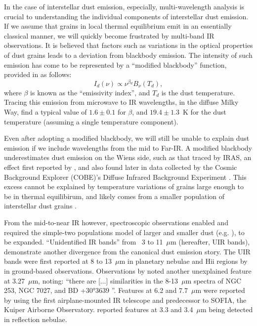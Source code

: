      In the case of interstellar dust emission, especially, multi-wavelength analysis is crucial to understanding the individual components of interstellar dust emission. If we assume that grains in local thermal equilibrium emit in an essentially classical manner, we will quickly become frustrated by multi-band IR observations. It is believed that factors such as variations in the optical properties of dust grains leads to a deviation from blackbody emission. The intensity of such emission has come to be represented by a ``modified blackbody'' function, provided in \cite{onaka99} as follows:
     \begin{equation}
         I_d(\nu) \propto \nu{}^{\beta{}_d}B_\nu{}(T_d),
         \label{eq:mbb}
     \end{equation}
     where $\beta$ is known as the ``emissivity index'', and $T_d$ is the dust temperature. Tracing this emission from microwave to IR wavelengths, in the diffuse Milky Way, \cite{planckIntXXIX16} find a typical value of $1.6 \pm 0.1$ for $\beta$, and $19.4 \pm 1.3$~K for the dust temperature (assuming a single temperature component).

     Even after adopting a modified blackbody, we will still be unable to explain dust emission if we include wavelengths from the mid to Far-IR. A modified blackbody underestimates dust emission on the Wiens side, such as that traced by IRAS, an effect first reported by \cite{boulanger85}, and also found later in data collected by the Cosmic  Background Explorer (COBE)'s Diffuse Infrared Background Experiment \citep{sodroski87, sodroski94}. This excess cannot be explained by temperature variations of grains large enough to be in thermal equilibirum, and likely comes from a smaller population of interstellar dust grains \citep{purcell76, sellgren84,dwek86,draine01}.

     From the mid-to-near IR however, spectroscopic observations enabled and required the simple-two populations model of larger and smaller dust (e.g. \cite{mathis77}), to be expanded. ``Unidentified IR bands'' from~ 3 to 11~$\mu$m (hereafter, UIR bands), demonstrate another divergence from the canonical dust emission story. The UIR bands were first reported at 8 to 13~$\mu$m in planetary nebulae and Hii regions by \cite{gillet73, gillet75} in ground-based observations. Observations by \cite{merrill75} noted another unexplained feature at 3.27~$\mu$m, noting: ``there are [...] similarities in the 8-13~$\mu$m spectra of NGC 253, NGC 7027, and BD +30°3639 \cite{gillett75}''. Features at 6.2 and 7.7~$\mu$m were reported by \cite{russell77} using the first airplane-mounted IR telescope and predecessor to SOFIA, the Kuiper Airborne Observatory. \cite{sellgren83} reported features at 3.3 and 3.4~$\mu$m being detected in reflection nebulae.

